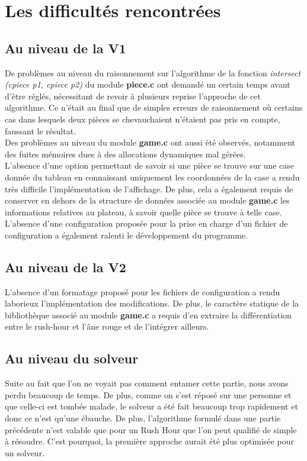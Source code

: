 \documentclass{report}
\begin{document}
\chapter{Les difficultés rencontrées}
\setcounter{section}{0}
\section{Au niveau de la V1}
De problèmes au niveau du raisonnement sur l'algorithme de la fonction \textit{intersect (cpiece p1, cpiece p2)} du module \textbf{piece.c} ont demandé un certain temps avant d'être réglés, nécessitant de revoir à plusieurs reprise l'approche de cet algorithme. Ce n'était au final que de simples erreurs de raisonnement où certains cas dans lesquels deux pièces se chevauchaient n'étaient pas pris en compte, faussant le résultat.\\
Des problèmes au niveau du module \textbf{game.c} ont aussi été observés, notamment des fuites mémoires dues à des allocations dynamiques mal gérées.\\
L'absence d'une option permettant de savoir si une pièce se trouve sur une case donnée du tableau en connaissant uniquement les coordonnées de la case a rendu très difficile l'implémentation de l'affichage.
De plus, cela a également requis de conserver en dehors de la structure de données associée au module \textbf{game.c} les informations relatives au plateau, à savoir quelle pièce se trouve à telle case.\\
L'absence d'une configuration proposée pour la prise en charge d'un fichier de configuration a également ralenti le développement du programme.

\section{Au niveau de la V2}
L'absence d'un formatage proposé pour les fichiers de configuration a rendu laborieux l'implémentation des modifications.
De plus, le caractère statique de la bibliothèque associé au module \textbf{game.c} a requis d'en extraire la différentiation entre le rush-hour et l'âne rouge et de l'intégrer ailleurs.

\section{Au niveau du solveur}
Suite au fait que l'on ne voyait pas comment entamer cette partie, nous avons perdu beaucoup de temps. De plus, comme on s'est réposé sur une personne et que celle-ci est tombée malade, le solveur a été fait beaucoup trop rapidement et donc ce n'est qu'une ébauche. De plus, l'algorithme formulé dans une partie précédente n'est valable que pour un Rush Hour que l'on peut qualifié de simple à résoudre. C'est pourquoi, la première approche aurait été plus optimisée pour un solveur.
\end{document}
